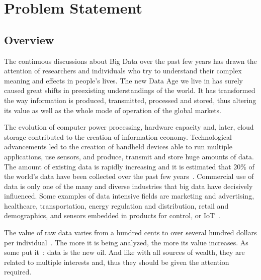 \chapter{Problem Statement}
\label{problem}

\section{Overview}
\label{problem:overview}

The continuous discussions about Big Data over the past few years has drawn the attention of researchers and individuals who try to understand their complex meaning and effects in people's lives. The new Data Age we live in has surely caused great shifts in preexisting understandings of the world.  It has transformed the way information is produced, transmitted, processed and stored, thus altering its value as well as the whole mode of operation of the global markets.

The evolution of computer power processing, hardware capacity and, later,  cloud storage contributed to the creation of information economy. Technological advancements led to the creation of handheld devices able to run multiple applications, use sensors, and produce, transmit and store huge amounts of data. The amount of existing data is rapidly increasing and it is estimated that 20\% of the world's data have been collected over the past few years~\cite{10.1109/SPW.2015.27,big_data_better_worse}. Commercial use of data is only one of the many and diverse industries that big data have decisively influenced. Some examples of data intensive fields are marketing and advertising, healthcare, transportation, energy regulation and distribution, retail and demographics, and sensors  embedded in products for control, or IoT~\cite{big_data}.

The value of raw data varies from a hundred cents to over several hundred dollars per individual~\cite{pr_data_cost_1, pr_data_cost_2, pr_data_cost_3}. The more it is being analyzed, the more its value increases. As some put it~\cite{data_new_oil_01,data_new_oil_02,data_new_oil_03,data_new_oil_04,data_new_oil_05,data_new_oil_05,data_new_oil_06,data_new_oil_07,data_new_oil_08,data_new_oil_09}: data is the new oil. And like with all sources of wealth, they are related to multiple interests and, thus they should be given the attention required.

\label{problem:sym:overview:personal}

